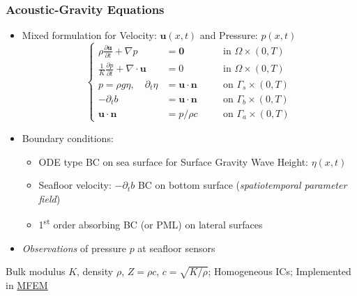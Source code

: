 \begin{frame}
    \frametitle{Acoustic-Gravity Equations}
    \begin{itemize}
        \item Mixed formulation for Velocity: \(\boldsymbol{u}(x, t)\) and Pressure: \(p(x, t)\)
        \[
        \left\{
        \begin{aligned}
        \rho \frac{\partial \boldsymbol{u}}{\partial t} + \nabla p &= \boldsymbol{0} && \quad \text{in } \Omega \times (0,T) \\
        \frac{1}{K} \frac{\partial p}{\partial t} + \nabla \cdot \boldsymbol{u} &= 0 && \quad \text{in } \Omega \times (0,T)\\
        p = \rho g \eta, \quad \partial_t \eta &= \boldsymbol{u} \cdot \boldsymbol{n} && \quad \text{on } \Gamma_s \times (0,T)\\
        -\partial_t b &= \boldsymbol{u} \cdot \boldsymbol{n}  && \quad \text{on } \Gamma_b \times (0,T)\\
        \boldsymbol{u} \cdot \boldsymbol{n} &= p / \rho c  && \quad \text{on } \Gamma_a \times (0,T)
        \end{aligned}
        \right.
        \]
        \item Boundary conditions:
        \begin{itemize}
            \item ODE type BC on sea surface for Surface Gravity Wave Height: \(\eta(x, t)\)
            \item Seafloor velocity: \(-\partial_t b\) BC on bottom surface (\emph{spatiotemporal parameter field})
            \item 1\textsuperscript{st} order absorbing BC (or PML) on lateral surfaces
        \end{itemize}
        \item \emph{Observations} of pressure \(p\) at seafloor sensors
    \end{itemize}
    \footnotesize{Bulk modulus \(K\), density \(\rho\), \(Z = \rho c\), \(c = \sqrt{K/\rho}\); Homogeneous ICs; Implemented in \href{https://mfem.org/}{MFEM}}
\end{frame}

